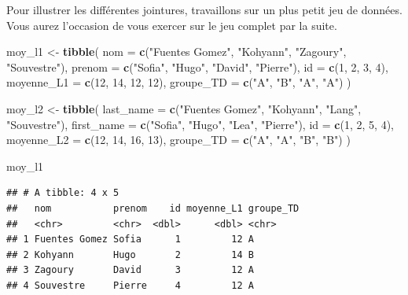 \documentclass[
  11pt,
]{book}
\newenvironment{Shaded}{\begin{snugshade}}{\end{snugshade}}
\newcommand{\AttributeTok}[1]{\textcolor[rgb]{0.13,0.29,0.53}{#1}}
\newcommand{\DecValTok}[1]{\textcolor[rgb]{0.00,0.00,0.81}{#1}}
\newcommand{\FunctionTok}[1]{\textcolor[rgb]{0.13,0.29,0.53}{\textbf{#1}}}
\newcommand{\NormalTok}[1]{#1}
\newcommand{\OtherTok}[1]{\textcolor[rgb]{0.56,0.35,0.01}{#1}}
\newcommand{\StringTok}[1]{\textcolor[rgb]{0.31,0.60,0.02}{#1}}
\numberwithin{equation}{section}
\numberwithin{countremarque}{section}
\begin{document}
Pour illustrer les différentes jointures, travaillons sur un plus petit jeu de données. Vous aurez l'occasion de vous exercer sur le jeu complet par la suite.

\begin{Shaded}
\begin{Highlighting}[]
\NormalTok{moy\_l1 }\OtherTok{\textless{}{-}} \FunctionTok{tibble}\NormalTok{(}
  \AttributeTok{nom =} \FunctionTok{c}\NormalTok{(}\StringTok{"Fuentes Gomez"}\NormalTok{, }\StringTok{"Kohyann"}\NormalTok{, }\StringTok{"Zagoury"}\NormalTok{, }\StringTok{"Souvestre"}\NormalTok{),}
  \AttributeTok{prenom =} \FunctionTok{c}\NormalTok{(}\StringTok{"Sofia"}\NormalTok{, }\StringTok{"Hugo"}\NormalTok{, }\StringTok{"David"}\NormalTok{, }\StringTok{"Pierre"}\NormalTok{),}
  \AttributeTok{id =} \FunctionTok{c}\NormalTok{(}\DecValTok{1}\NormalTok{, }\DecValTok{2}\NormalTok{, }\DecValTok{3}\NormalTok{, }\DecValTok{4}\NormalTok{),}
  \AttributeTok{moyenne\_L1 =} \FunctionTok{c}\NormalTok{(}\DecValTok{12}\NormalTok{, }\DecValTok{14}\NormalTok{, }\DecValTok{12}\NormalTok{, }\DecValTok{12}\NormalTok{),}
  \AttributeTok{groupe\_TD =} \FunctionTok{c}\NormalTok{(}\StringTok{"A"}\NormalTok{, }\StringTok{"B"}\NormalTok{, }\StringTok{"A"}\NormalTok{, }\StringTok{"A"}\NormalTok{)}
\NormalTok{)}

\NormalTok{moy\_l2 }\OtherTok{\textless{}{-}} \FunctionTok{tibble}\NormalTok{(}
  \AttributeTok{last\_name =} \FunctionTok{c}\NormalTok{(}\StringTok{"Fuentes Gomez"}\NormalTok{, }\StringTok{"Kohyann"}\NormalTok{, }\StringTok{"Lang"}\NormalTok{, }\StringTok{"Souvestre"}\NormalTok{),}
  \AttributeTok{first\_name =} \FunctionTok{c}\NormalTok{(}\StringTok{"Sofia"}\NormalTok{, }\StringTok{"Hugo"}\NormalTok{, }\StringTok{"Lea"}\NormalTok{, }\StringTok{"Pierre"}\NormalTok{),}
  \AttributeTok{id =} \FunctionTok{c}\NormalTok{(}\DecValTok{1}\NormalTok{, }\DecValTok{2}\NormalTok{, }\DecValTok{5}\NormalTok{, }\DecValTok{4}\NormalTok{),}
  \AttributeTok{moyenne\_L2 =} \FunctionTok{c}\NormalTok{(}\DecValTok{12}\NormalTok{, }\DecValTok{14}\NormalTok{, }\DecValTok{16}\NormalTok{, }\DecValTok{13}\NormalTok{),}
  \AttributeTok{groupe\_TD =} \FunctionTok{c}\NormalTok{(}\StringTok{"A"}\NormalTok{, }\StringTok{"A"}\NormalTok{, }\StringTok{"B"}\NormalTok{, }\StringTok{"B"}\NormalTok{)}
\NormalTok{)}

\NormalTok{moy\_l1}
\end{Highlighting}
\end{Shaded}

\begin{lstlisting}
## # A tibble: 4 x 5
##   nom           prenom    id moyenne_L1 groupe_TD
##   <chr>         <chr>  <dbl>      <dbl> <chr>    
## 1 Fuentes Gomez Sofia      1         12 A        
## 2 Kohyann       Hugo       2         14 B        
## 3 Zagoury       David      3         12 A        
## 4 Souvestre     Pierre     4         12 A
\end{lstlisting}
\end{document}
